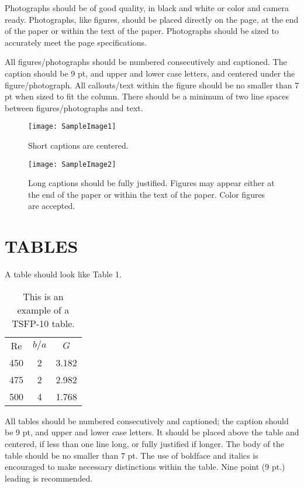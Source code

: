 \documentclass[twocolumn,10pt]{tsfp}
\begin{document}
Photographs should be of good quality, in black and white or color and camera ready. Photographs, like figures, should be placed directly on the page, at the end of the paper or within the text of the paper. Photographs should be sized to accurately meet the page specifications.

All figures/photographs should be numbered consecutively and captioned. The caption should be 9 pt, and upper and lower case letters, and centered under the figure/photograph. All callouts/text within the figure should be no smaller than 7 pt when sized to fit the column.
There should be a minimum of two line spaces between figures/photographs and text.


	\begin{figure}[t]
	\centering
	\texttt{[image: SampleImage1]}
	\caption{Short captions are centered.}
	\label{figure1}
	\end{figure}

	\begin{figure*}
	\centering
	\texttt{[image: SampleImage2]}
	\caption{Long captions should be fully justified. Figures may appear either at the end of the paper or within the text of the paper.  Color figures are accepted.}
	\label{figure2}
	\end{figure*}


\section*{TABLES}

A table should look like Table 1.

\begin{table}[ht]
\centering
\caption{This is an example of a TSFP-10 table.}
\label{Table1}
\begin{tabular}{c c c}
& & \\ %
\hline
\hline
Re	& $b/a$	& $G$ \\
\hline
450	& 2	& 3.182 \\
475	& 2	& 2.982 \\
500	& 4	& 1.768 \\
\hline
\hline
\end{tabular}
\end{table}

All tables should be numbered consecutively and captioned; the caption should be 9 pt, and upper and lower case letters. It should be placed above the table and centered, if less than one line long, or fully justified if longer. The body of the table should be no smaller than 7 pt. The use of boldface and italics is encouraged to make necessary distinctions within the table. Nine point (9 pt.) leading is recommended.
\end{document}
